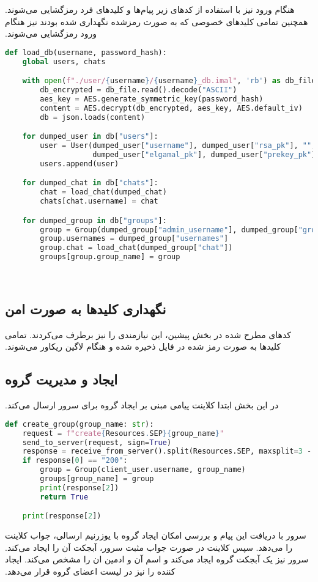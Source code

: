 ‫هنگام ورود نیز با استفاده از کدهای زیر پیام‌ها و کلیدهای فرد رمزگشایی می‌شوند. همچنین تمامی کلیدهای خصوصی که به صورت رمزشده نگهداری شده بودند نیز هنگام ورود رمزگشایی می‌شوند.
‫
\begin{latin}
\begin{lstlisting}[firstnumber=104, language=Python]
def load_db(username, password_hash):
    global users, chats

    with open(f"./user/{username}/{username}_db.imal", 'rb') as db_file:
        db_encrypted = db_file.read().decode("ASCII")
        aes_key = AES.generate_symmetric_key(password_hash)
        content = AES.decrypt(db_encrypted, aes_key, AES.default_iv)
        db = json.loads(content)

    for dumped_user in db["users"]:
        user = User(dumped_user["username"], dumped_user["rsa_pk"], "",
                    dumped_user["elgamal_pk"], dumped_user["prekey_pk"])
        users.append(user)

    for dumped_chat in db["chats"]:
        chat = load_chat(dumped_chat)
        chats[chat.username] = chat

    for dumped_group in db["groups"]:
        group = Group(dumped_group["admin_username"], dumped_group["group_name"])
        group.usernames = dumped_group["usernames"]
        group.chat = load_chat(dumped_group["chat"])
        groups[group.group_name] = group

\end{lstlisting}
\end{latin}
‫
‫\subsection{نگهداری کلیدها به صورت امن}
‫کدهای مطرح شده در بخش پیشین، این نیازمندی را نیز برطرف می‌کردند. تمامی کلیدها به صورت رمز شده در فایل ذخیره شده و هنگام لاگین ریکاور می‌شوند.
‫
‫\subsection{ایجاد و مدیریت گروه}
‫در این بخش ابتدا کلاینت پیامی مبنی بر ایجاد گروه برای سرور ارسال می‌کند.
‫
\begin{latin}
\begin{lstlisting}[firstnumber=615, language=Python]
def create_group(group_name: str):
    request = f"create{Resources.SEP}{group_name}"
    send_to_server(request, sign=True)
    response = receive_from_server().split(Resources.SEP, maxsplit=3 - 1)
    if response[0] == "200":
        group = Group(client_user.username, group_name)
        groups[group_name] = group
        print(response[2])
        return True

    print(response[2])
\end{lstlisting}
\end{latin}
‫
‫سرور با دریافت این پیام و بررسی امکان ایجاد گروه با یوزرنیم ارسالی، جواب کلاینت را می‌دهد. سپس کلاینت در صورت جواب مثبت سرور، آبجکت آن را ایجاد می‌کند. سرور نیز یک آبجکت گروه ایجاد می‌کند و اسم آن و ادمین ان را مشخص می‌کند. ایجاد کننده را نیز در لیست اعضای گروه قرار می‌دهد.
‫

